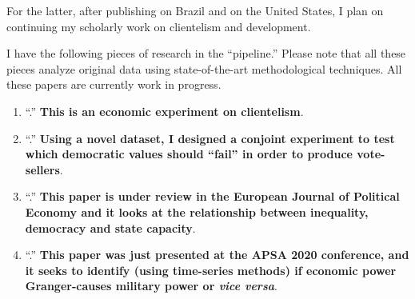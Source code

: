 \documentclass[10pt,stdletter,dateno,sigleft]{newlfm} %
\begin{document}
\begin{newlfm}
For the latter, after publishing \href{https://journals.sub.uni-hamburg.de/giga/jpla/article/view/1121/1128}{\emph{\unskip}} on Brazil and  \href{https://link.springer.com/article/10.1057/s41269-020-00174-4}{\emph{\unskip}} on the United States, I plan on continuing my scholarly work on clientelism and development. 

I have the following pieces of research in the ``pipeline.'' Please note that all these pieces analyze original data using state-of-the-art methodological techniques. All these papers are currently work in progress.

\begin{enumerate}

  \item ``\href{https://github.com/hbahamonde/Economic_Experiment_Vote_Selling/raw/master/Vote_Selling_Bahamonde_Canales_Paper.pdf}{{\unskip}}.'' {\bf This is an economic experiment on clientelism}. {\unskip}

  \item ``\href{https://github.com/hbahamonde/Conjoint_US/raw/master/Bahamonde_Quininao_Conjoint.pdf}{{\unskip}}.'' {\bf Using a novel dataset, I designed a conjoint experiment to test which democratic values should ``fail'' in order to produce vote-sellers}. {\unskip}

  \item ``\href{https://github.com/hbahamonde/Inequality_State_Capacities/raw/master/Paper_EJPE_Under_Review.pdf}{{\unskip}}.'' {\bf This paper is under review in the European Journal of Political Economy and it looks at the relationship between inequality, democracy and state capacity}. {\unskip}

  \item ``\href{https://github.com/hbahamonde/Bahamonde_Kovac/raw/master/Bahamonde_Kovac.pdf}{{\unskip}}.'' {\bf This paper was just presented at the APSA 2020 conference, and it seeks to identify (using time-series methods) if economic power Granger-causes military power or \emph{vice versa}}. {\unskip}


\end{enumerate}
\end{newlfm}
\end{document}
